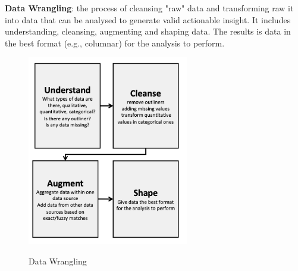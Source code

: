 \documentclass[10pt,a4paper]{article}
\begin{document}
\textbf{Data Wrangling}: the process of cleansing "raw" data and transforming raw it into data that can be analysed to generate valid actionable insight. It includes understanding, cleansing, augmenting and shaping data. The results is data in the best format (e.g., columnar) for the analysis to perform.
\begin{figure}[h!]
 \hfill \includegraphics[width=200pt]{images/data-wrangling.png}\hspace*{\fill}
  \label{fig:data-wrangling}
  \caption{Data Wrangling}
\end{figure}
\pagebreak
\end{document}
